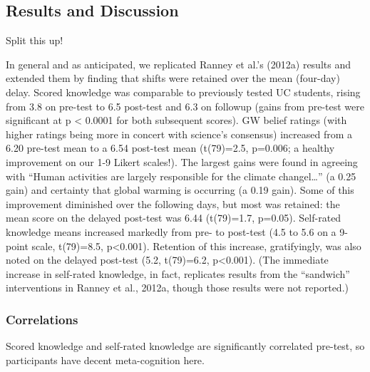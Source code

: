 \subsection{Results and Discussion} 

Split this up!

In general and as anticipated, we replicated Ranney et
al.’s (2012a) results and extended them by finding that shifts were retained
over the mean (four-day) delay. 
Scored knowledge was comparable to previously
tested UC students, rising from 3.8 on pre-test to 6.5 post-test and 6.3 on
followup (gains from pre-test were significant at p < 0.0001 for both subsequent
scores). GW belief ratings (with higher ratings being
more in concert with science’s consensus) increased from a 6.20 pre-test mean to
a 6.54 post-test mean (t(79)=2.5, p=0.006; a healthy improvement on our 1-9
Likert scales!). The largest gains were found in agreeing with ``Human activities
are largely responsible for the climate changel\ldots'' (a 0.25 gain) and certainty
that global warming is occurring (a 0.19 gain). 
Some of this improvement
diminished over the following days, but most was retained: the mean score on the
delayed post-test was 6.44 (t(79)=1.7, p=0.05). Self-rated knowledge means
increased markedly from pre- to post-test (4.5 to 5.6 on a 9-point scale,
t(79)=8.5, p<0.001). Retention of this increase, gratifyingly, was also noted on
the delayed post-test (5.2, t(79)=6.2, p<0.001). (The immediate increase in
self-rated knowledge, in fact, replicates results from the ``sandwich''
interventions in Ranney et al., 2012a, though those results were not reported.)


\subsubsection{Correlations}

Scored knowledge and self-rated knowledge are significantly correlated pre-test,
so participants have decent meta-cognition here.

